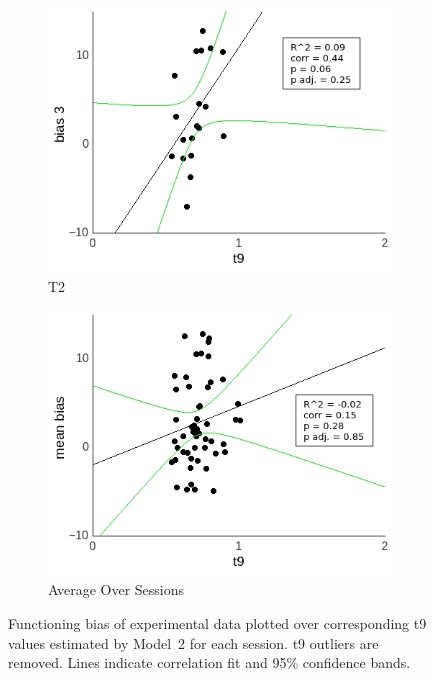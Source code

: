 \documentclass[a4paper]{scrreprt}
\begin{document}
\begin{figure}
\begin{subfigure}[b]{0.49\textwidth}
        \includegraphics[width=\textwidth]{figs/sec3/t9/t9no_diff_3_mod2dat.jpeg}
        \caption{T2}
    \end{subfigure}
    \begin{subfigure}[b]{0.49\textwidth}
        \includegraphics[width=\textwidth]{figs/sec3/t9/t9no_diff_mean_mod2dat.jpeg}
        \caption{Average Over Sessions}
    \end{subfigure}
\caption{Functioning bias of experimental data plotted over corresponding t9 values estimated by Model~2 for each session. t9 outliers are removed. Lines indicate correlation fit and 95\% confidence bands.}
\label{fig:t9no_diff_mod2dat}
\end{figure}
\end{document}
